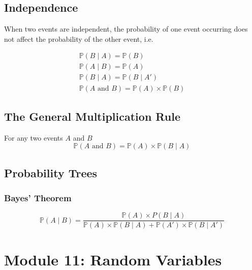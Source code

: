 \documentclass[12pt letter]{report}
\begin{document}
\section{Independence}

When two events are independent, the probability of one event occurring does not affect the probability of the other
event, i.e.

\begin{align*}
	\mathbb{P} \left( B  \mid  A \right) = \mathbb{P} \left( B \right)           \\
	\mathbb{P} \left( A  \mid B \right)  = \mathbb{P} \left( A \right)           \\
	\mathbb{P} \left( B  \mid A \right)  = \mathbb{P} \left( B  \mid A'  \right) \\
	\mathbb{P} \left( A \text{ and } B \right) = \mathbb{P} \left( A \right)  \times \mathbb{P} \left( B \right)
\end{align*}

\section{The General Multiplication Rule}

For any two events $A$ and $B$
\[
	\mathbb{P} \left( A \text{ and } B \right) = \mathbb{P} \left( A \right) \times \mathbb{P} \left( B  \mid A \right)
\]

\section{Probability Trees}


\subsection{Bayes' Theorem}

\[
	\mathbb{P} \left( A  \mid B \right)  = \frac{\mathbb{P} \left( A \right) \times P \left( B  \mid A \right)   }{
		\mathbb{P} \left( A \right) \times \mathbb{P} \left( B  \mid A \right) + \mathbb{P} \left( A' \right) \times \mathbb{P}
		\left( B  \mid A' \right) }
\]

\chapter{Module 11: Random Variables}
\end{document}
